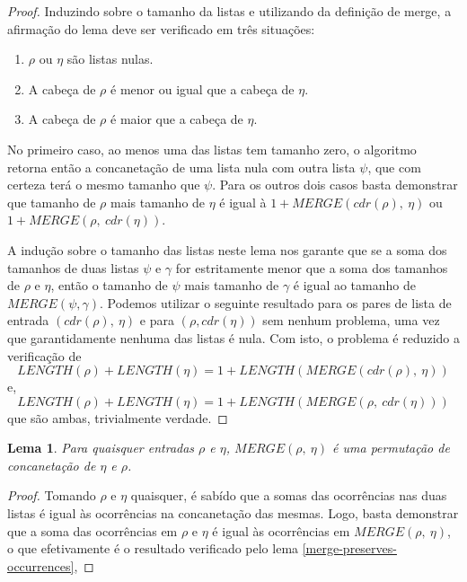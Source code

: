 \documentclass[12pt]{article}
\newtheorem{lemma}[theorem]{Lema}
\theoremstyle{definition}
\begin{document}
\begin{proof}
        Induzindo sobre o tamanho da listas e utilizando da definição de merge, a afirmação do
        lema deve ser verificado em três situações:
        \begin{enumerate}
                \item $\rho$ ou $\eta$ são listas nulas.
                \item A cabeça de $\rho$ é menor ou igual que a cabeça de $\eta$.
                \item A cabeça de $\rho$ é maior que a cabeça de $\eta$.
        \end{enumerate}

        No primeiro caso, ao menos uma das listas tem tamanho zero, o algoritmo retorna então a concanetação de uma
        lista nula com outra lista $\psi$, que com certeza terá o mesmo tamanho que $\psi$. Para os outros dois casos
        basta demonstrar que tamanho de $\rho$ mais tamanho de $\eta$ é igual à $1 + MERGE(cdr(\rho),\ \eta)$ ou
        $1 + MERGE(\rho,\ cdr(\eta))$. 

        A indução sobre o tamanho das listas neste lema nos garante que se a soma dos tamanhos de duas listas $\psi$ e $\gamma$ 
        for estritamente menor que a soma dos tamanhos de $\rho$ e $\eta$, então o tamanho de $\psi$ mais tamanho de $\gamma$ é igual ao tamanho
        de $MERGE(\psi, \gamma)$. Podemos utilizar o seguinte resultado para os pares de lista de entrada $(cdr(\rho),\ \eta)$ 
        e para $(\rho, cdr(\eta))$ sem nenhum problema, uma vez que garantidamente nenhuma das listas é nula. Com isto, o problema
        é reduzido a verificação de
        \begin{equation*}
                LENGTH(\rho) + LENGTH(\eta) = 1 + LENGTH(MERGE(cdr(\rho),\ \eta))
        \end{equation*}
        e,
        \begin{equation*}
                LENGTH(\rho) + LENGTH(\eta) = 1 + LENGTH(MERGE(\rho,\ cdr(\eta)))
        \end{equation*}
        que são ambas, trivialmente verdade.
\end{proof}

\begin{lemma}
\label{merge-is-permutation}
        Para quaisquer entradas $\rho$ e $\eta$, $MERGE(\rho,\ \eta)$ é uma permutação de concanetação de $\eta$ e $\rho$.
\end{lemma}
\begin{proof}
        Tomando $\rho$ e $\eta$ quaisquer, é sabído que a somas das ocorrências nas duas listas é igual às ocorrências
        na concanetação das mesmas. Logo, basta demonstrar que a soma das ocorrências em $\rho$ e $\eta$ é igual às
        ocorrências em $MERGE(\rho,\ \eta)$, o que efetivamente é o resultado verificado pelo lema \ref{merge-preserves-occurrences}, 
\end{proof}
\end{document}

